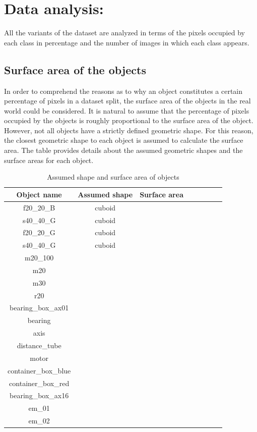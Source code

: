 \section{Data analysis:}
\label{section:analysis}
	All the variants of the dataset are analyzed in terms of the pixels occupied by each class in percentage and the number of images in which each class appears.
	
	\subsection{Surface area of the objects}
		
		In order to comprehend the reasons as to why an object constitutes a certain percentage of pixels in a dataset split, the surface area of the objects in the real world could be considered. It is natural to assume that the percentage of pixels occupied by the objects is roughly proportional to the surface area of the object. However, not all objects have a strictly defined geometric shape. For this reason, the closest geometric shape to each object is assumed to calculate the surface area. The table provides details about the assumed geometric shapes and the surface areas for each object.
		
		\begin{table}
			\centering
			\begin{tabular}{|c|c|c|c|c|c|c|c|}
			\hline 
  			\textbf{Object name} & \textbf{Assumed shape} & \textbf{Surface area} \\ 
			\hline
  			 f20\_20\_B & cuboid &  \\ 
			\hline
  			 s40\_40\_G & cuboid &  \\ 
			\hline
  			 f20\_20\_G & cuboid &  \\ 
			\hline
  			 s40\_40\_G & cuboid &  \\ 
			\hline
  			 m20\_100 &  &  \\ 
			\hline
  			 m20 &  &  \\ 
			\hline
  			 m30 &  &  \\ 
			\hline
  			 r20 &  &  \\ 
			\hline
  			 bearing\_box\_ax01 &  &  \\ 
			\hline
  			 bearing &  &  \\ 
			\hline
  			 axis &  &  \\ 
			\hline
  			 distance\_tube &  &  \\ 
			\hline
  			 motor &  &  \\ 
			\hline
  			 container\_box\_blue &  &  \\ 
			\hline
  			 container\_box\_red &  &  \\ 
			\hline
  			 bearing\_box\_ax16 &  &  \\ 
			\hline
  			 em\_01 &  &  \\ 
			\hline
  			 em\_02 &  &  \\ 
			\hline
			\end{tabular}
			\caption{Assumed shape and surface area of objects} 
			\label{Table:surface}
		\end{table}
		
